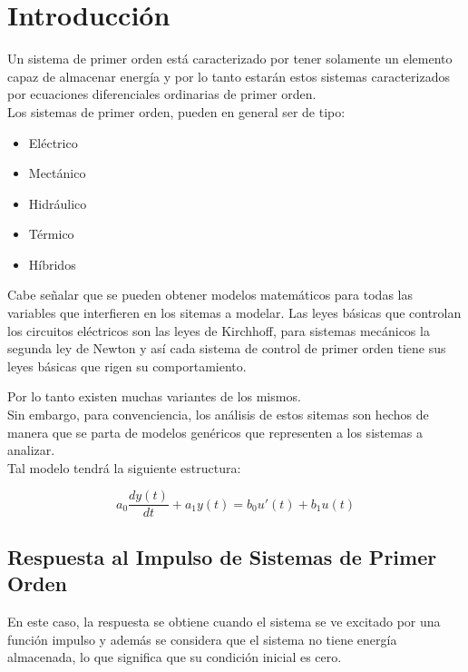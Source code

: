 \documentclass[12pt]{article}
\begin{document}
\section{Introducción}

Un sistema de primer orden está caracterizado por tener solamente un elemento capaz de almacenar energía y por lo tanto estarán estos sistemas caracterizados por ecuaciones diferenciales ordinarias de primer orden.\\

Los sistemas de primer orden, pueden en general ser de tipo:
\begin{itemize}
\item Eléctrico
\item Mectánico
\item Hidráulico
\item Térmico
\item Híbridos
\end{itemize}

Cabe señalar que se pueden obtener modelos matemáticos para todas las variables que interfieren en los sitemas a modelar. Las leyes básicas que controlan los circuitos eléctricos son las leyes de Kirchhoff, para sistemas mecánicos la segunda ley de Newton y así cada sistema de control de primer orden tiene sus leyes básicas que rigen su comportamiento.

Por lo tanto existen muchas variantes de los mismos.\\

Sin embargo, para convenciencia, los análisis de estos sitemas son hechos de manera que se parta de modelos genéricos que representen a los sistemas a analizar.\\

Tal modelo tendrá la siguiente estructura:

\begin{equation}
a_0\frac{dy(t)}{dt}+a_1y(t)=b_0u'(t)+b_1u(t)
\end{equation}



\subsection{Respuesta al Impulso de Sistemas de Primer Orden}

En este caso, la respuesta se obtiene cuando el sistema se ve excitado por una función impulso y además se considera que el sistema no tiene energía almacenada, lo que significa que su condición inicial es cero.\\
\end{document}

